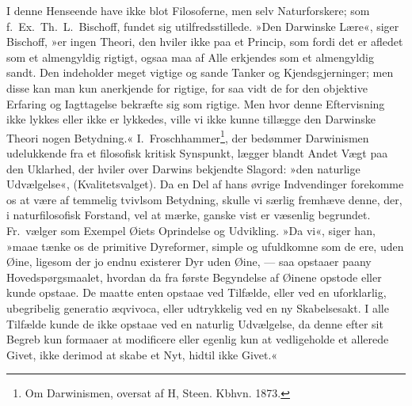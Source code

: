 \documentclass[12pt,a4paper]{article}
\newcommand{\apage}[1]{\marginnote{\footnotesize\textit{[#1]}}}
\begin{document}
I denne Henseende have ikke blot Filosoferne, men selv Naturforskere;
som f.\ Ex.\ Th.\ L.\ Bischoff, fundet sig utilfredsstillede. »Den
Darwinske Lære«, siger Bischoff, »er ingen Theori, den hviler ikke paa
et Princip, som fordi det er afledet som et almengyldig rigtigt, ogsaa
maa af Alle erkjendes som et almengyldig sandt. Den indeholder meget
vigtige og sande Tanker og Kjendsgjerninger; men disse kan man kun
anerkjende for rigtige, for saa vidt de for den objektive Erfaring og
Iagttagelse bekræfte sig som rigtige. Men hvor denne Eftervisning ikke
lykkes eller ikke er lykkedes, ville vi ikke kunne \apage{451}tillægge den
Darwinske Theori nogen Betydning.«
I.\ Froschhammer\footnote{Om Darwinismen, oversat af H, Steen.
Kbhvn. 1873.}, der bedømmer Darwinismen udelukkende fra et filosofisk
kritisk Synspunkt, lægger blandt Andet Vægt paa den Uklarhed, der
hviler over Darwins bekjendte Slagord: »den naturlige Udvælgelse«,
(Kvalitetsvalget). Da en Del af hans øvrige Indvendinger forekomme os
at være af temmelig tvivlsom Betydning, skulle vi særlig fremhæve
denne, der, i naturfilosofisk Forstand, vel at mærke, ganske vist er
væsenlig begrundet.
Fr.\ vælger som Exempel Øiets Oprindelse og Udvikling. »Da vi«, siger
han, »maae tænke os de primitive Dyreformer, simple og ufuldkomne som
de ere, uden Øine, ligesom der jo endnu existerer Dyr uden Øine, --- saa
opstaaer paany Hovedspørgsmaalet, hvordan da fra første Begyndelse af
Øinene opstode eller kunde opstaae. De maatte enten opstaae ved
Tilfælde, eller ved en uforklarlig, ubegribelig generatio æqvivoca,
eller udtrykkelig ved en ny Skabelsesakt. I alle Tilfælde kunde de
ikke opstaae ved en naturlig Udvælgelse, da denne efter sit Begreb kun
formaaer at modificere eller egenlig kun at vedligeholde et allerede
Givet, ikke derimod at skabe et Nyt, hidtil ikke Givet.«
\end{document}

